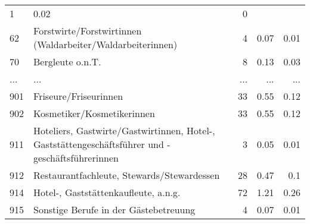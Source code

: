 \begin{longtable}{lXrrr}
          \num{1} &
          \num[round-mode=places,round-precision=2]{0.02} &
          \num[round-mode=places,round-precision=2]{0} \\
        62 & \multicolumn{1}{X}{Forstwirte/Forstwirtinnen (Waldarbeiter/Waldarbeiterinnen)} & %
          \num{4} &
          \num[round-mode=places,round-precision=2]{0.07} &
          \num[round-mode=places,round-precision=2]{0.01} \\
        70 & \multicolumn{1}{X}{Bergleute o.n.T.} & %
          \num{8} &
          \num[round-mode=places,round-precision=2]{0.13} &
          \num[round-mode=places,round-precision=2]{0.03} \\
       ... & ... & ... & ... & ... \\
        901 & \multicolumn{1}{X}{Friseure/Friseurinnen} & %
          \num{33} &
          \num[round-mode=places,round-precision=2]{0.55} &
          \num[round-mode=places,round-precision=2]{0.12} \\

        902 & \multicolumn{1}{X}{Kosmetiker/Kosmetikerinnen} & %
          \num{33} &
          \num[round-mode=places,round-precision=2]{0.55} &
          \num[round-mode=places,round-precision=2]{0.12} \\

        911 & \multicolumn{1}{X}{Hoteliers, Gastwirte/Gastwirtinnen, Hotel-, Gaststättengeschäftsführer und -geschäftsführerinnen} & %
          \num{3} &
          \num[round-mode=places,round-precision=2]{0.05} &
          \num[round-mode=places,round-precision=2]{0.01} \\

        912 & \multicolumn{1}{X}{Restaurantfachleute, Stewards/Stewardessen} & %
          \num{28} &
          \num[round-mode=places,round-precision=2]{0.47} &
          \num[round-mode=places,round-precision=2]{0.1} \\

        914 & \multicolumn{1}{X}{Hotel-, Gaststättenkaufleute, a.n.g.} & %
          \num{72} &
          \num[round-mode=places,round-precision=2]{1.21} &
          \num[round-mode=places,round-precision=2]{0.26} \\

        915 & \multicolumn{1}{X}{Sonstige Berufe in der Gästebetreuung} & %
          \num{4} &
          \num[round-mode=places,round-precision=2]{0.07} &
          \num[round-mode=places,round-precision=2]{0.01} \\


\end{longtable}
